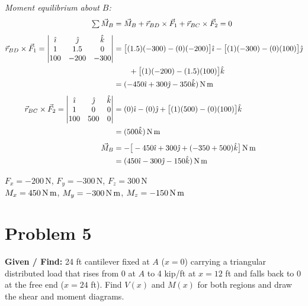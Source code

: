 \documentclass[11pt]{article}
\newcommand{\un}[1]{\,\text{#1}}
\begin{document}
\textit{Moment equilibrium about $B$:}
\begin{align*}
\textstyle\sum \vec M_B &= \vec M_B + \vec r_{BD}\times\vec F_1 + \vec r_{BC}\times\vec F_2 = 0\\[4pt]
\vec r_{BD}\times\vec F_1 = \begin{vmatrix}\hat\imath & \hat\jmath & \hat k\\ 1 & 1.5 & 0\\ 100 & -200 & -300\end{vmatrix}
&= \big[(1.5)(-300) - (0)(-200)\big]\hat\imath - \big[(1)(-300) - (0)(100)\big]\hat\jmath\\
&\qquad + \big[(1)(-200) - (1.5)(100)\big]\hat k\\
&= (-450\hat\imath + 300\hat\jmath - 350\hat k)\un{N\,m}\\[4pt]
\vec r_{BC}\times\vec F_2 = \begin{vmatrix}\hat\imath & \hat\jmath & \hat k\\ 1 & 0 & 0\\ 100 & 500 & 0\end{vmatrix}
&= (0)\hat\imath - (0)\hat\jmath + \big[(1)(500) - (0)(100)\big]\hat k\\ &= (500\hat k)\un{N\,m}\\[4pt]
\vec M_B &= -\big[-450\hat\imath + 300\hat\jmath + (-350+500)\hat k\big]\un{N\,m}\\
&= (450\hat\imath - 300\hat\jmath - 150\hat k)\un{N\,m}
\end{align*}


\begin{finalanswer}
$F_x = -200\un{N}$, \quad $F_y = -300\un{N}$, \quad $F_z = 300\un{N}$\\[4pt]
$M_x = 450\un{N\,m}$, \quad $M_y = -300\un{N\,m}$, \quad $M_z = -150\un{N\,m}$
\end{finalanswer}

\clearpage
\section*{Problem 5}

\textbf{Given / Find:} 24 ft cantilever fixed at $A$ ($x=0$) carrying a triangular distributed load that rises from 0 at $A$ to 4 kip/ft at $x = 12$ ft and falls back to 0 at the free end ($x = 24$ ft). Find $V(x)$ and $M(x)$ for both regions and draw the shear and moment diagrams.
\end{document}
